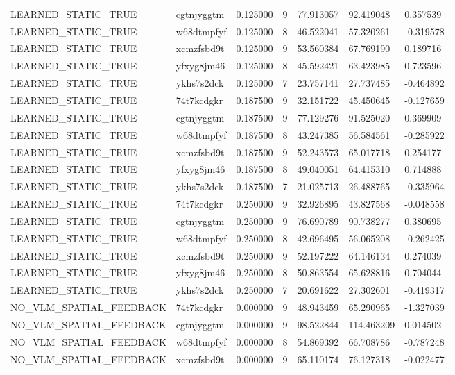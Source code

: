\begin{tabular}{lllllll}
LEARNED\_STATIC\_TRUE & cgtnjyggtm & 0.125000 & 9 & 77.913057 & 92.419048 & 0.357539 \\
LEARNED\_STATIC\_TRUE & w68dtmpfyf & 0.125000 & 8 & 46.522041 & 57.320261 & -0.319578 \\
LEARNED\_STATIC\_TRUE & xcmzfsbd9t & 0.125000 & 9 & 53.560384 & 67.769190 & 0.189716 \\
LEARNED\_STATIC\_TRUE & yfxyg8jm46 & 0.125000 & 8 & 45.592421 & 63.423985 & 0.723596 \\
LEARNED\_STATIC\_TRUE & ykhs7s2dck & 0.125000 & 7 & 23.757141 & 27.737485 & -0.464892 \\
LEARNED\_STATIC\_TRUE & 74t7kcdgkr & 0.187500 & 9 & 32.151722 & 45.450645 & -0.127659 \\
LEARNED\_STATIC\_TRUE & cgtnjyggtm & 0.187500 & 9 & 77.129276 & 91.525020 & 0.369909 \\
LEARNED\_STATIC\_TRUE & w68dtmpfyf & 0.187500 & 8 & 43.247385 & 56.584561 & -0.285922 \\
LEARNED\_STATIC\_TRUE & xcmzfsbd9t & 0.187500 & 9 & 52.243573 & 65.017718 & 0.254177 \\
LEARNED\_STATIC\_TRUE & yfxyg8jm46 & 0.187500 & 8 & 49.040051 & 64.415310 & 0.714888 \\
LEARNED\_STATIC\_TRUE & ykhs7s2dck & 0.187500 & 7 & 21.025713 & 26.488765 & -0.335964 \\
LEARNED\_STATIC\_TRUE & 74t7kcdgkr & 0.250000 & 9 & 32.926895 & 43.827568 & -0.048558 \\
LEARNED\_STATIC\_TRUE & cgtnjyggtm & 0.250000 & 9 & 76.690789 & 90.738277 & 0.380695 \\
LEARNED\_STATIC\_TRUE & w68dtmpfyf & 0.250000 & 8 & 42.696495 & 56.065208 & -0.262425 \\
LEARNED\_STATIC\_TRUE & xcmzfsbd9t & 0.250000 & 9 & 52.197222 & 64.146134 & 0.274039 \\
LEARNED\_STATIC\_TRUE & yfxyg8jm46 & 0.250000 & 8 & 50.863554 & 65.628816 & 0.704044 \\
LEARNED\_STATIC\_TRUE & ykhs7s2dck & 0.250000 & 7 & 20.691622 & 27.302601 & -0.419317 \\
NO\_VLM\_SPATIAL\_FEEDBACK & 74t7kcdgkr & 0.000000 & 9 & 48.943459 & 65.290965 & -1.327039 \\
NO\_VLM\_SPATIAL\_FEEDBACK & cgtnjyggtm & 0.000000 & 9 & 98.522844 & 114.463209 & 0.014502 \\
NO\_VLM\_SPATIAL\_FEEDBACK & w68dtmpfyf & 0.000000 & 8 & 54.869392 & 66.708786 & -0.787248 \\
NO\_VLM\_SPATIAL\_FEEDBACK & xcmzfsbd9t & 0.000000 & 9 & 65.110174 & 76.127318 & -0.022477 \\

\end{tabular}
